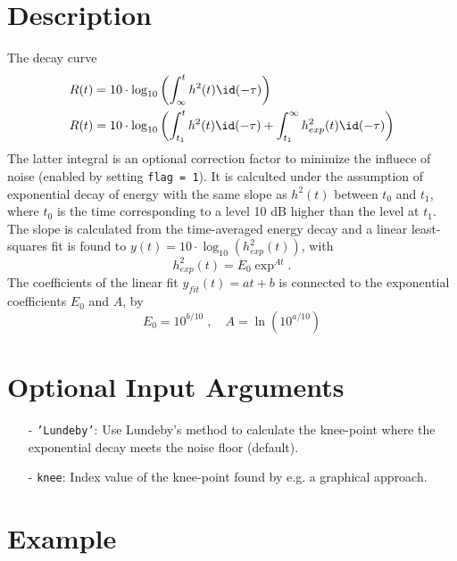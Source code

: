\section{Description} %
\label{sec:rbaSchroeder_description}
The decay curve
\begin{align}
	R(t) &= 10\cdot\log_{10}\left(\int_{\infty}^{t}h^2(t)\id(-\tau)\right)\\
	R(t) &= 10\cdot\log_{10}\left(\int_{t_1}^t h^2(t)\id(-\tau)+\int_{t_1}^{\infty} h_{exp}^2(t)\id(-\tau)	\right)
\end{align}
The latter integral is an optional correction factor to minimize the influece of noise (enabled by setting \texttt{flag = 1}). It is calculted under the assumption of exponential decay of energy with the same slope as $h^2(t)$ between $t_0$ and $t_1$, where $t_0$ is the time corresponding to a level 10 dB higher than the level at $t_1$. The slope is calculated from the time-averaged energy decay and a linear least-squares fit is found to $y(t) = 10\cdot\log_{10}\left(h_{exp}^2(t)\right)$, with
\begin{equation}
	h_{exp}^2(t) = E_0\exp^{At}.
\end{equation}
The coefficients of the linear fit $y_{fit}(t) = at+b$ is connected to the exponential coefficients $E_0$ and $A$, by
\begin{equation}
	E_0 = 10^{b/10}\; ,\quad A = \ln\left(10^{a/10}\right)
\end{equation}


\section{Optional Input Arguments} %
\label{sec:rbaSchroeder_optional_input_arguments}
\begin{itemize}
	\item[-] \texttt{'Lundeby'}: Use Lundeby's method to calculate the knee-point where the exponential decay meets the noise floor (default).
	 \item[-] \texttt{knee}: Index value of the knee-point found by e.g. a graphical approach.
\end{itemize}

\section{Example} %
\label{sec:rbaSchroeder_example}

